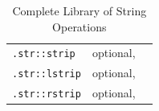 {\begin{table}[t]
\begin{tabular}{l p{3cm} p{6cm}}
            \lstinline{.str::strip}      & optional,                                     &                                                                                                                        \\
            \lstinline{.str::lstrip}     & optional,                                     &                                                                                                                        \\
            \lstinline{.str::rstrip}     & optional,                                     &                                                                                                                        \\
            \bottomrule
        \end{tabular}
        \caption{Complete Library of String Operations}
        \label{tab:strops} %
    \end{table}
}

